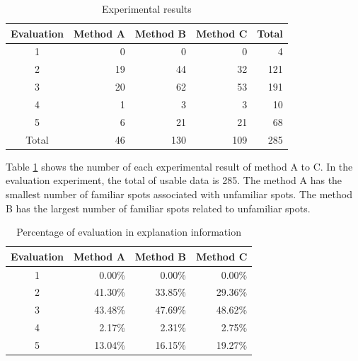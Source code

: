 \documentclass[journal]{IAENGtran}
\begin{document}
\begin{table}[t]
  \caption{Experimental results}
  \label{table:Statistics on the number of data of experiment results}
  \centering
  \begin{tabular}{c|r|r|r|r}
  \hline
  Evaluation & \multicolumn{1}{c|}{Method A} & \multicolumn{1}{c|}{Method B} & \multicolumn{1}{c|}{Method C} &  \multicolumn{1}{c}{Total} \\ \hline
  1  & 0                      & 0                      & 0                      & 4                      \\
  2  & 19                     & 44                     & 32                     & 121                    \\
  3  & 20                     & 62                     & 53                     & 191                    \\
  4  & 1                      & 3                      & 3                      & 10                     \\
  5  & 6                      & 21                     & 21                     & 68                     \\ \hline
  Total & 46                     & 130                    & 109                    & 285                    \\ \hline
  \end{tabular}
\end{table}

Table \ref{table:Statistics on the number of data of experiment results} shows the number of each experimental result of method A to C.
In the evaluation experiment, the total of usable data is 285.
The method A has the smallest number of familiar spots associated with unfamiliar spots.
The method B has the largest number of familiar spots related to unfamiliar spots.

\begin{table}[t]
  \caption{Percentage of evaluation in explanation information}
  \label{table:Percentage of evaluation in explanation information}
  \centering
  \begin{tabular}{c|r|r|r}
  \hline
  Evaluation & \multicolumn{1}{c|}{Method A} & \multicolumn{1}{c|}{Method B} & \multicolumn{1}{c}{Method C} \\ \hline
  1  & 0.00\%                     & 0.00\%                     & 0.00\%                                         \\
  2  & 41.30\%                    & 33.85\%                    & 29.36\%                                       \\
  3  & 43.48\%                    & 47.69\%                    & 48.62\%                                       \\
  4  & 2.17\%                     & 2.31\%                     & 2.75\%                                         \\
  5  & 13.04\%                    & 16.15\%                    & 19.27\%                                       \\ \hline
  \end{tabular}
\end{table}
\end{document}
